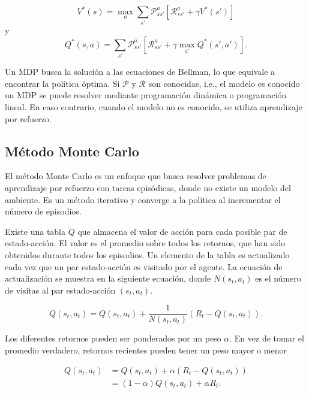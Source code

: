 \[
V^*(s) = \max_{a}\sum_{s'}\mathcal{P}_{ss'}^a[\mathcal{R}_{ss'}^a + \gamma V^*(s')]
\]
y 
\[
Q^*(s,a) = \sum_{s'}\mathcal{P}_{ss'}^a[\mathcal{R}_{ss'}^a + \gamma \max_{a'}Q^*(s',a')].
\]

Un MDP busca la solución a las ecuaciones de Bellman, lo que equivale a encontrar
la política óptima. Si $\mathcal{P}$ y $\mathcal{R}$ son conocidas, i.e., el
modelo es conocido un MDP se puede resolver mediante programación dinámica o
programación lineal. En caso contrario, cuando el modelo no es conocido,
se utiliza aprendizaje por refuerzo.

\subsection{Método Monte Carlo}\label{subsection-montecarlo}

El método Monte Carlo es un enfoque que busca resolver problemas
de aprendizaje por refuerzo con tareas episódicas, donde 
no existe un modelo del ambiente. 
Es un método iterativo y converge a la política
al incrementar el número de episodios.

Existe una tabla $Q$ que almacena el valor de acción para cada posible
par de estado-acción. El valor es el promedio sobre
todos los retornos, que han sido obtenidos durante todos los episodios. 
Un elemento de la tabla es actualizado cada vez que un par estado-acción
es visitado por el agente. La ecuación de actualización se muestra en la 
siguiente ecuación, donde $N(s_t, a_t)$ es el número de visitas al 
par estado-acción $(s_t, a_t)$.

\[
Q(s_t, a_t) = Q(s_t, a_t) + \frac{1}{N(s_t, a_t)} (R_t - Q(s_t, a_t)).
\]

Los diferentes retornos pueden 
ser ponderados por un peso $\alpha$.
En vez de tomar el promedio
verdadero, retornos recientes pueden tener un peso mayor o menor

\begin{equation}\label{eq:montecarlo-update}
\begin{split}
Q(s_t, a_t) &= Q(s_t, a_t) + \alpha(R_t - Q(s_t, a_t))\\
&= (1-\alpha)Q(s_t, a_t) + \alpha R_t.
\end{split}
\end{equation}

